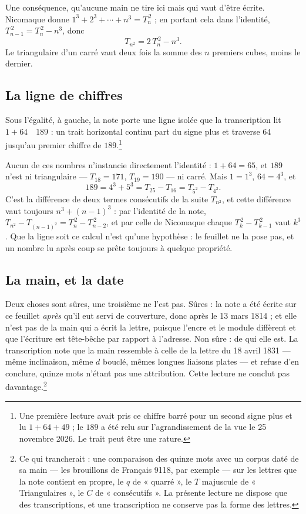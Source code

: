 \documentclass[11pt,a4paper]{article}
\begin{document}
Une conséquence, qu'aucune main ne tire ici mais qui vaut d'être écrite.
Nicomaque donne $1^3 + 2^3 + \cdots + n^3 = T_n^{\,2}$ ; en portant cela dans
l'identité, $T_{n-1}^{\,2} = T_n^{\,2} - n^3$, donc
\[
T_{n^2} = 2\,T_n^{\,2} - n^3 .
\]
Le triangulaire d'un carré vaut deux fois la somme des $n$ premiers cubes,
moins le dernier.

\subsection*{La ligne de chiffres}

Sous l'égalité, à gauche, la note porte une ligne isolée que la transcription
lit $1 + 64 \quad 189$ : un trait horizontal continu part du signe plus et
traverse $64$ jusqu'au premier chiffre de $189$.\footnote{Une première lecture
avait pris ce chiffre barré pour un second signe plus et lu $1 + 64 + 49$ ;
le $189$ a été relu sur l'agrandissement de la vue le 25 novembre 2026. Le
trait peut être une rature.}

Aucun de ces nombres n'instancie directement l'identité : $1 + 64 = 65$, et
$189$ n'est ni triangulaire --- $T_{18} = 171$, $T_{19} = 190$ --- ni carré.
Mais $1 = 1^3$, $64 = 4^3$, et
\[
189 = 4^3 + 5^3 = T_{25} - T_{16} = T_{5^2} - T_{4^2}.
\]
C'est la différence de deux termes consécutifs de la suite $T_{n^2}$, et
cette différence vaut toujours $n^3 + (n-1)^3$ : par l'identité de la note,
$T_{n^2} - T_{(n-1)^2} = T_n^{\,2} - T_{n-2}^{\,2}$, et par celle de Nicomaque
chaque $T_k^{\,2} - T_{k-1}^{\,2}$ vaut $k^3$. Que la ligne soit ce calcul
n'est qu'une hypothèse : le feuillet ne la pose pas, et un nombre lu après
coup se prête toujours à quelque propriété.

\subsection*{La main, et la date}

Deux choses sont sûres, une troisième ne l'est pas. Sûres : la note a été
écrite sur ce feuillet \emph{après} qu'il eut servi de couverture, donc après
le 13 mars 1814 ; et elle n'est pas de la main qui a écrit la lettre, puisque
l'encre et le module diffèrent et que l'écriture est tête-bêche par rapport à
l'adresse. Non sûre : de qui elle est. La transcription note que la main
ressemble à celle de la lettre du 18 avril 1831 --- même inclinaison, même
$d$ bouclé, mêmes longues liaisons plates --- et refuse d'en conclure, quinze
mots n'étant pas une attribution. Cette lecture ne conclut pas
davantage.\footnote{Ce qui trancherait : une comparaison des quinze mots avec
un corpus daté de sa main --- les brouillons de Français 9118, par exemple ---
sur les lettres que la note contient en propre, le $q$ de « quarré », le $T$
majuscule de « Triangulaires », le $C$ de « consécutifs ». La présente
lecture ne dispose que des transcriptions, et une transcription ne conserve pas
la forme des lettres.}
\end{document}
